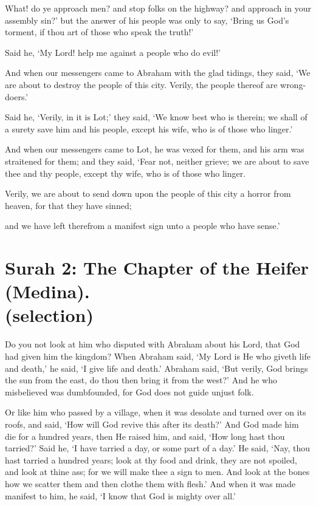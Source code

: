 \documentclass[fontsize=14pt, letterpaper, notitlepage, openany, DIV=12]{scrbook} %
\begin{document}
\noindent[29:29]
What! do ye approach men? and stop folks on the highway? and approach in your
assembly sin?' but the answer of his people was only to say, `Bring us God's torment, if thou art
of those who speak the truth!'

\noindent[29:30]
Said he, `My Lord! help me against a people who do evil!'

\noindent[29:31]
And when our messengers came to Abraham with the glad tidings, they said, `We are
about to destroy the people of this city. Verily, the people thereof are wrong-doers.'

\noindent[29:32]
Said he, `Verily, in it is Lot;' they said, `We know best who is therein; we shall of a
surety save him and his people, except his wife, who is of those who linger.'

\noindent[29:33]
And when our messengers came to Lot, he was vexed for them, and his arm was
straitened for them; and they said, `Fear not, neither grieve; we are about to save thee and thy
people, except thy wife, who is of those who linger.

\noindent[29:34]
Verily, we are about to send down upon the people of this city a horror from heaven, for
that they have sinned;

\noindent[29:35]
and we have left therefrom a manifest sign unto a people who have sense.'


\section[Surah 2: The Chapter of the Heifer (Medina).]{Surah 2: The Chapter of the Heifer (Medina).\\ (selection)}


\noindent[2:258]
Do you not look at him who disputed with Abraham about his Lord, that God had given
him the kingdom? When Abraham said, `My Lord is He who giveth life and death,' he said, `I
give life and death.' Abraham said, `But verily, God brings the sun from the east, do thou then
bring it from the west?' And he who misbelieved was dumbfounded, for God does not guide
unjust folk.

\noindent[2:259]
Or like him who passed by a village, when it was desolate and turned over on its roofs,
and said, `How will God revive this after its death?' And God made him die for a hundred years,
then He raised him, and said, `How long hast thou tarried?' Said he, `I have tarried a day, or
some part of a day.' He said, `Nay, thou hast tarried a hundred years; look at thy food and drink,
they are not spoiled, and look at thine ass; for we will make thee a sign to men. And look at the
bones how we scatter them and then clothe them with flesh.' And when it was made manifest to
him, he said, `I know that God is mighty over all.'
\end{document}
